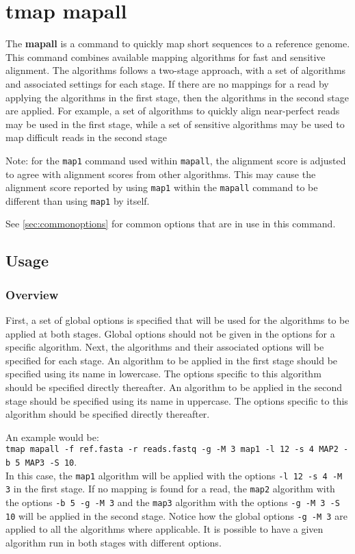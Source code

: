 \documentclass[a4paper,12pt]{book}
\newcommand{\TT}[1]{{\tt #1}} %
\newcommand{\BF}[1]{{\bf #1}} %
\begin{document}
\section{tmap mapall}
\label{sec:mapall}
The \BF{mapall} is a command to quickly map short sequences to a reference genome.
This command combines available mapping algorithms for fast and sensitive alignment.
The algorithms follows a two-stage approach, with a set of algorithms and associated settings for each stage.
If there are no mappings for a read by applying the algorithms in the first stage, then the algorithms in the second stage are applied. 
For example, a set of algorithms to quickly align near-perfect reads may be used in the first stage, while a set of sensitive algorithms may be used to map difficult reads in the second stage

Note: for the \TT{map1} command used within \TT{mapall}, the alignment score is adjusted to agree with alignment scores from other algorithms.
This may cause the alignment score reported by using \TT{map1} within the \TT{mapall} command to be different than using \TT{map1} by itself.

See \autoref{sec:commonoptions} for common options that are in use in this command.

\subsection{Usage}

\subsubsection{Overview}
First, a set of global options is specified that will be used for the algorithms to be applied at both stages.
Global options should not be given in the options for a specific algorithm.
Next, the algorithms and their associated options will be specified for each stage.
An algorithm to be applied in the first stage should be specified using its name in lowercase.
The options specific to this algorithm should be specified directly thereafter.
An algorithm to be applied in the second stage should be specified using its name in uppercase.
The options specific to this algorithm should be specified directly thereafter.

An example would be:\\
\TT{tmap mapall -f ref.fasta -r reads.fastq -g -M 3 map1 -l 12 -s 4 MAP2 -b 5 MAP3 -S 10}.\\
In this case, the \TT{map1} algorithm will be applied with the options \TT{-l 12 -s 4 -M 3} in the first stage.
If no mapping is found for a read, the \TT{map2} algorithm with the options \TT{-b 5 -g -M 3} and the \TT{map3} algorithm with the options \TT{-g -M 3 -S 10} will be applied in the second stage.
Notice how the global options \TT{-g -M 3} are applied to all the algorithms where applicable.
It is possible to have a given algorithm run in both stages with different options.
\end{document}
